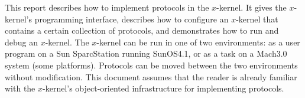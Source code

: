 This report describes how to implement protocols in the $x$-kernel.
It gives the $x$-kernel's programming interface, describes how to
configure an $x$-kernel that contains a certain collection of
protocols, and demonstrates how to run and debug an $x$-kernel.  The
$x$-kernel can be run in one of two environments: as a user program on
a Sun SparcStation running SunOS4.1, or as a task on a Mach3.0 system
(some platforms).  Protocols can be moved between the two environments
without modification.  This document assumes that the reader is
already familiar with the $x$-kernel's object-oriented infrastructure
for implementing protocols.



